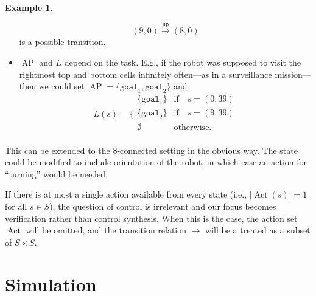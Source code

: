 \documentclass{amsart}
\DeclareMathOperator{\Act}{Act}
\DeclareMathOperator{\ap}{AP}
\theoremstyle{plain}
\theoremstyle{definition}
\theoremstyle{definition}
\newtheorem{examp}{Example}
\begin{document}
\begin{examp}
\begin{itemize}
\[
(9,0) \overset{\mathtt{up}}{\longrightarrow} (8,0)
\]
is a possible transition.
\item $\ap$ and $L$ depend on the task.  E.g., if the robot was supposed to visit the rightmost top and bottom cells infinitely often---as in a surveillance mission---then we could set $\ap=\{ \mathtt{goal}_1, \mathtt{goal}_2 \}$ and
\[
L(s) = \Bigg\{ \begin{array}{ll}
\{\mathtt{goal}_1 \} & \mathrm{if}\quad s = (0,39)\\
\{\mathtt{goal}_2 \} & \mathrm{if}\quad s = (9,39)\\
\emptyset & \mathrm{otherwise.} \\
\end{array}
\]
\end{itemize}
This can be extended to the 8-connected setting in the obvious way.  The state
could be modified to include orientation of the robot, in which case an action
for ``turning'' would be needed.
\end{examp}

If there is at most a single action available from every state (i.e., $\lvert
\Act(s) \rvert = 1$ for all $s\in S$), the question of control is irrelevant and
our focus becomes verification rather than control synthesis. When this is the
case, the action set $\Act$ will be omitted, and the transition relation
$\longrightarrow$ will be a treated as a subset of $S\times S$.


\section{Simulation}\label{sec:sim}
\end{document}
